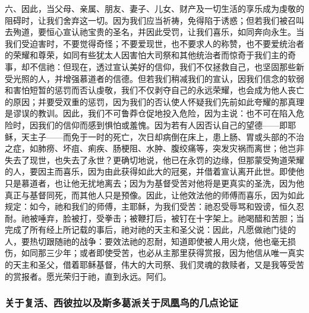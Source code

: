 六、因此，当父母、亲属、朋友、妻子、儿女、财产及一切生活的享乐成为虔敬的阻碍时，让我们舍弃这一切。因为我们应当祈祷，免得陷于诱惑；但若我们被召叫去殉道，要恒心宣认祂宝贵的圣名，并因此受罚，让我们喜乐，如同奔向永生。当我们受迫害时，不要觉得奇怪；不要爱现世，也不要求人的称赞，也不要爱统治者的荣耀和尊荣，如同有些犹太人因害怕大司祭和其他统治者而惊奇于我们主的奇事，却不信祂：但现在，透过宣认美好的信仰，我们不仅拯救自己，也坚固那些新受光照的人，并增强慕道者的信德。但若我们稍减我们的宣认，因我们信念的软弱和害怕短暂的惩罚而否认虔敬，我们不仅剥夺自己的永远荣耀，也会成为他人丧亡的原因；并要受双重的惩罚，因为我们的否认使人怀疑我们先前如此夸耀的那真理是谬误的教训。因此，我们不可鲁莽仓促地投入危险，因为主说：也不可在陷入危险时，因我们的信仰而感到惧怕或羞愧。因为若有人因否认自己的望德——即耶稣，天主子——而免于一时的死亡，次日却病倒在床上，患上肠、胃或头部的不治之症，如肺痨、坏疽、痢疾、肠梗阻、水肿、腹绞痛等，突发灾祸而离世；他岂非失去了现世，也失去了永世？更确切地说，他已在永罚的边缘，但那蒙受殉道荣耀的人，要因主而喜乐，因为由此获得如此大的冠冕，并借着宣认离开此世。即使他只是慕道者，也让他无扰地离去；因为为基督受苦对他将是更真实的圣洗，因为他真正与基督同死，而其他人只是预像。因此，让他效法他的师傅而喜乐，因为如此规定：如今，祂和我们的师傅，主耶稣，为我们受苦：祂忍受辱骂和毁谤，恒久忍耐。祂被唾弃，脸被打，受拳击；被鞭打后，被钉在十字架上。祂喝醋和苦胆；当完成了所有经上所记载的事后，祂对祂的天主和圣父说：因此，凡愿做祂门徒的人，要热切跟随祂的战争：要效法祂的忍耐，知道即使被人用火烧，他也毫无损伤，如同那三少年；或者即使受苦，也必从主那里获得赏报，因为他信从唯一真实的天主和圣父，借着耶稣基督，伟大的大司祭、我们灵魂的救赎者，又是我等受苦的赏报者。愿光荣归于祂，直到永远。阿们。\par


\subsubsection{关于复活、西彼拉以及斯多葛派关于凤凰鸟的几点论证}

